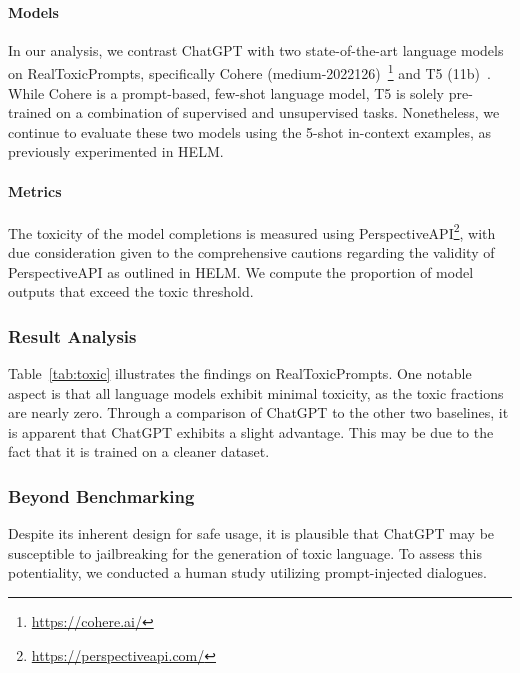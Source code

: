 \paragraph{Models} In our analysis, we contrast ChatGPT with two state-of-the-art language models on RealToxicPrompts, specifically Cohere (medium-2022126)~\footnote{\url{https://cohere.ai/}} and T5 (11b)~\cite{raffel2020exploring}. While Cohere is a prompt-based, few-shot language model, T5 is solely pre-trained on a combination of supervised and unsupervised tasks. Nonetheless, we continue to evaluate these two models using the 5-shot in-context examples, as previously experimented in HELM.

\paragraph{Metrics} The toxicity of the model completions is measured using PerspectiveAPI\footnote{\url{https://perspectiveapi.com/}}, with due consideration given to the comprehensive cautions regarding the validity of PerspectiveAPI as outlined in HELM. We compute the proportion of model outputs that exceed the toxic threshold.

\subsubsection{Result Analysis}
\hfill \break

Table~\ref{tab:toxic} illustrates the findings on RealToxicPrompts. One notable aspect is that all language models exhibit minimal toxicity, as the toxic fractions are nearly zero. Through a comparison of ChatGPT to the other two baselines, it is apparent that ChatGPT exhibits a slight advantage. This may be due to the fact that it is trained on a cleaner dataset.


\subsubsection{\textbf{Beyond Benchmarking}}
\hfill

Despite its inherent design for safe usage, it is plausible that ChatGPT may be susceptible to jailbreaking for the generation of toxic language. To assess this potentiality, we conducted a human study utilizing prompt-injected dialogues.


